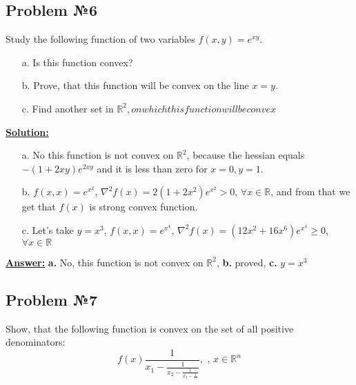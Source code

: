 \subsection{Problem №6}
Study the following function of two variables $f(x, y) = e^{xy}$.
\begin{enumerate}
    \item[a.] Is this function convex?
    \item[b.] Prove, that this function will be convex on the line $x=y$.
    \item[c.] Find another set in $\mathds{R}^2, on which this function will be convex$
\end{enumerate}

\underline{\textbf{Solution:}}
\begin{enumerate}
    \item[a.] No this function is not convex on $\mathds{R}^2$, because the hessian equals $-(1+2xy)e^{2xy}$ and it is less than zero for $x = 0, y = 1$.
    \item[b.] $f(x, x) = e^{x^2}$, $\nabla^2 f(x) = 2(1+2x^2)e^{x^2} > 0$, $\forall x \in \mathds{R}$, and from that we get that $f(x)$ is strong convex function.
    \item[c.] Let's take $y = x^3$, $f(x, x) = e^{x^4}$, $\nabla^2 f(x) = (12x^2 + 16x^6)e^{x^4} \geq 0 $, $\forall x \in \mathds{R}$
\end{enumerate}

\underline{\textbf{Answer:}} 
\textbf{a.} No, this function is not convex on $\mathds{R}^2$, \textbf{b.} proved, \textbf{c.} $y = x^3$

\subsection{Problem №7}
Show, that the following function is convex on  the set of all positive denominators:
\begin{equation*}
    f(x) \frac{1}{x_1 - \frac{1}{x_2 - \frac{1}{x_3 - \frac{1}{...}}}}, \text{ , } x \in \mathds{R}^n
\end{equation*}

